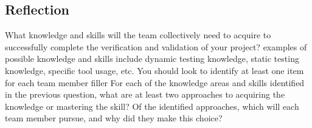 \documentclass[12pt]{article}
\begin{document}
\subsection{Reflection}
\begin{outline}[enumerate]
  \1 What knowledge and skills will the team collectively need to acquire to successfully complete the verification and validation of your project?
  examples of possible knowledge and skills include dynamic testing knowledge, static testing knowledge, specific tool usage, etc. You should look to
  identify at least one item for each team member
    \2 filler
  \1 For each of the knowledge areas and skills identified in the previous question, what are at least two approaches to acquiring the knowledge or
  mastering the skill? Of the identified approaches, which will each team member pursue, and why did they make this choice?
\end{outline}
\end{document}

